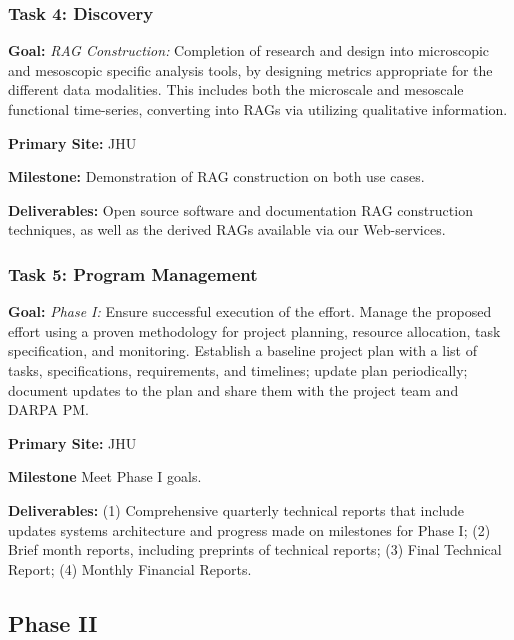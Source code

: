 \subsubsection{Task 4: Discovery}
\begin{compactitem}
\item \textbf{Goal:} \emph{RAG Construction:} 
 Completion of research and design into microscopic and mesoscopic specific analysis tools, by designing metrics appropriate for the different data modalities.  This includes both the microscale and mesoscale functional time-series, converting into RAGs via utilizing qualitative information.
\item \textbf{Primary Site:} JHU
\item \textbf{Milestone:} Demonstration of RAG construction on both use cases.
\item \textbf{Deliverables:} Open source software and documentation RAG construction techniques, as well as the derived RAGs available via our Web-services.
\end{compactitem}



\subsubsection{Task 5: Program Management}
\begin{compactitem}
\item \textbf{Goal:} \emph{Phase I:} Ensure successful execution of the effort. Manage the proposed effort using a proven methodology for project planning, resource allocation, task specification, and monitoring. Establish a baseline project plan with a list of tasks, specifications, requirements, and timelines; update plan periodically; document updates to the plan and share them with the project team and DARPA PM.
\item \textbf{Primary Site:} JHU
\item \textbf{Milestone} Meet Phase I goals.
\item \textbf{Deliverables:} 
(1) Comprehensive quarterly technical reports that include updates systems architecture and progress made on milestones for Phase I;
(2) Brief month reports, including preprints of technical reports;
(3) Final Technical Report;
(4) Monthly Financial Reports.
\end{compactitem}



\subsection{Phase II}





